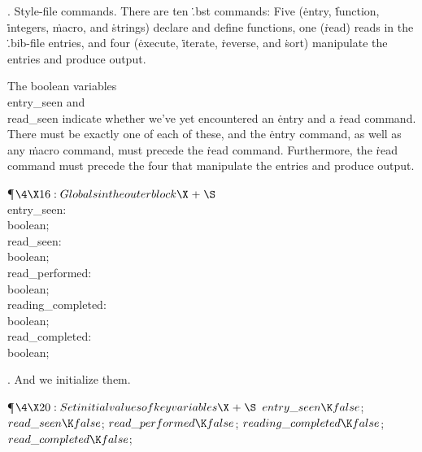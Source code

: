 .  Style-file commands.
There are ten \.{.bst} commands: Five (\.{entry}, \.{function},
\.{integers}, \.{macro}, and \.{strings}) declare and define
functions, one (\.{read}) reads in the \.{.bib}-file entries, and four
(\.{execute}, \.{iterate}, \.{reverse}, and \.{sort})
manipulate the entries and produce output.

The boolean variables \\{entry\_seen} and \\{read\_seen} indicate whether
we've yet encountered an \.{entry} and a \.{read} command.  There must
be exactly one of each of these, and the \.{entry} command, as well as
any \.{macro} command, must precede the \.{read} command.
Furthermore, the \.{read} command must precede the four that
manipulate the entries and produce output.

\Y\P$\4\X16:Globals in the outer block\X\mathrel{+}\S$\6
\4\\{entry\_seen}: \\{boolean};\6
\4\\{read\_seen}: \\{boolean};\6
\4\\{read\_performed}: \\{boolean};\6
\4\\{reading\_completed}: \\{boolean};\6
\4\\{read\_completed}: \\{boolean};\par
\fi

.
And we initialize them.

\Y\P$\4\X20:Set initial values of key variables\X\mathrel{+}\S$\6
$\\{entry\_seen}\K\\{false}$;\5
$\\{read\_seen}\K\\{false}$;\5
$\\{read\_performed}\K\\{false}$;\5
$\\{reading\_completed}\K\\{false}$;\5
$\\{read\_completed}\K\\{false}$;\par
\fi

